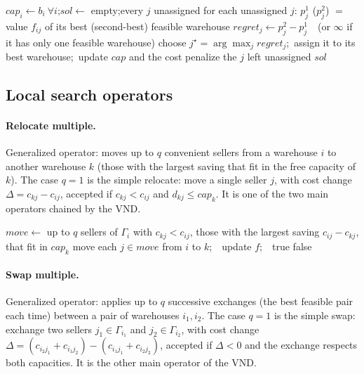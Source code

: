 \documentclass[11pt,a4paper]{article}
\begin{document}
\begin{algorithm}[H]
\caption{Constructive heuristic: regret insertion with measure $f$}
\begin{algorithmic}[1]
  \State $cap_i \gets b_i\ \forall i$;\quad $sol \gets$ empty;\quad every $j$ unassigned
    \State for each unassigned $j$: $p^1_j$ ($p^2_j$) $=$ value $f_{ij}$ of its best (second-best) feasible warehouse
    \State $regret_j \gets p^2_j - p^1_j$\ \ (or $\infty$ if it has only one feasible warehouse)
    \State choose $j^\star = \arg\max_j regret_j$;\ assign it to its best warehouse;\ update $cap$ and the cost
  \EndWhile
  \State penalize the $j$ left unassigned
  \State \Return $sol$
\EndFunction
\end{algorithmic}
\end{algorithm}

\subsection{Local search operators}

\paragraph{Relocate multiple.} Generalized operator: moves up to $q$ convenient sellers from a
warehouse $i$ to another warehouse $k$ (those with the largest saving that fit in the free
capacity of $k$). The case $q{=}1$ is the simple relocate: move a single seller $j$, with cost
change $\Delta = c_{kj}-c_{ij}$, accepted if $c_{kj}<c_{ij}$ and $d_{kj}\le cap_k$. It is one of
the two main operators chained by the VND.

\begin{algorithm}[H]
\caption{\emph{Relocate multiple} operator (first improvement)}
\begin{algorithmic}[1]
    \State $move \gets$ up to $q$ sellers of $\Gamma_i$ with $c_{kj}<c_{ij}$, those with the largest saving $c_{ij}-c_{kj}$, that fit in $cap_k$
      \State move each $j\in move$ from $i$ to $k$;\ \ update $f$;\ \ \Return true
    \EndIf
  \EndFor
  \State \Return false
\EndFunction
\end{algorithmic}
\end{algorithm}

\paragraph{Swap multiple.} Generalized operator: applies up to $q$ successive exchanges (the best
feasible pair each time) between a pair of warehouses $i_1,i_2$. The case $q{=}1$ is the simple
swap: exchange two sellers $j_1\in\Gamma_{i_1}$ and $j_2\in\Gamma_{i_2}$, with cost change
$\Delta = (c_{i_2 j_1}+c_{i_1 j_2})-(c_{i_1 j_1}+c_{i_2 j_2})$, accepted if $\Delta<0$ and the
exchange respects both capacities. It is the other main operator of the VND.
\end{document}
